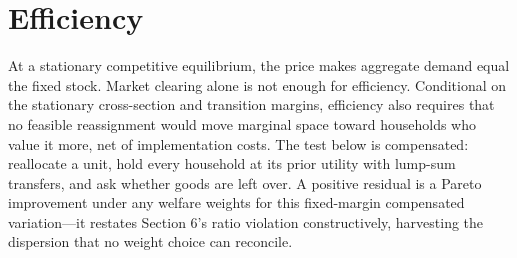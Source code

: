 \documentclass[11pt]{article}
\newcommand{\1}{\mathbf 1}
\begin{document}
\section{Efficiency}

At a stationary competitive equilibrium, the price makes aggregate demand equal the fixed stock. Market clearing alone is not enough for efficiency. Conditional on the stationary cross-section and transition margins, efficiency also requires that no feasible reassignment would move marginal space toward households who value it more, net of implementation costs. The test below is compensated: reallocate a unit, hold every household at its prior utility with lump-sum transfers, and ask whether goods are left over. A positive residual is a Pareto improvement under any welfare weights for this fixed-margin compensated variation---it restates Section 6's ratio violation constructively, harvesting the dispersion that no weight choice can reconcile.
\end{document}
